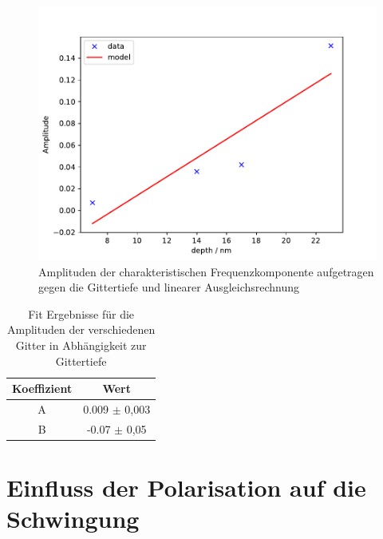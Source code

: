 \begin{figure}[h!]
 	\centering
 	\includegraphics[width=\textwidth]{img/amplitudes.pdf}
 	\caption{Amplituden der charakteristischen Frequenzkomponente aufgetragen gegen die Gittertiefe und linearer Ausgleichsrechnung}
 	\label{abb:film}
\end{figure}

\begin{table}[h!]
 \centering
\begin{tabular}{cc}
    Koeffizient & Wert \\
	\midrule
 	A & 0.009 $\pm$ 0,003 \\
 	B & -0.07 $\pm$ 0,05 \\
\end{tabular}
\caption{Fit Ergebnisse für die Amplituden der verschiedenen Gitter in Abhängigkeit zur Gittertiefe}
\label{tab:fit}
\end{table}

\section{Einfluss der Polarisation auf die Schwingung}

